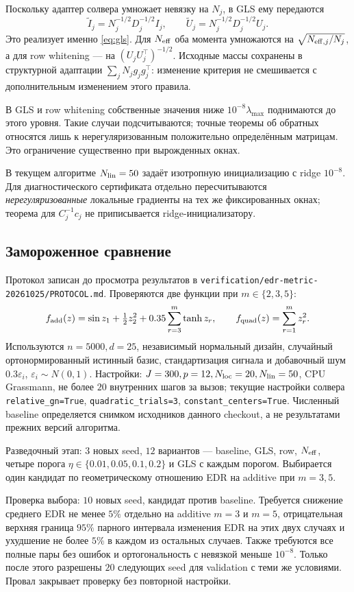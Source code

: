 \documentclass[11pt,a4paper]{article}
\newcommand{\code}[1]{\nolinkurl{#1}}
\begin{document}
Поскольку адаптер солвера умножает невязку на $N_j$, в GLS ему передаются
\[
 \widetilde I_j=N_j^{-1/2}D_j^{-1/2}I_j,\qquad
 \widetilde U_j=N_j^{-1/2}D_j^{-1/2}U_j.
\]
Это реализует именно \eqref{eq:gls}. Для $N_{\rm eff}$ оба момента
умножаются на $\sqrt{N_{{\rm eff},j}/N_j}$, а для row whitening ---
на $(U_jU_j^\top)^{-1/2}$. Исходные массы сохранены в структурной
адаптации $\sum_jN_jg_jg_j^\top$: изменение критерия не смешивается
с дополнительным изменением этого правила.

В GLS и row whitening собственные значения ниже
$10^{-8}\lambda_{\max}$ поднимаются до этого уровня. Такие случаи
подсчитываются; точные теоремы об обратных относятся лишь к
нерегуляризованным положительно определённым матрицам.
Это ограничение существенно при вырожденных окнах.

В текущем алгоритме $N_{\rm lin}=50$ задаёт изотропную инициализацию
с ridge $10^{-8}$. Для диагностического сертификата отдельно
пересчитываются \emph{нерегуляризованные} локальные градиенты
на тех же фиксированных окнах; теорема для $C_j^{-1}c_j$ не
приписывается ridge-инициализатору.

\subsection{Замороженное сравнение}
Протокол записан до просмотра результатов в
\code{verification/edr-metric-20261025/PROTOCOL.md}.
Проверяются две функции при $m\in\{2,3,5\}$:
\[
 f_{\rm add}(z)=\sin z_1+\tfrac12z_2^2+
 0.35\sum_{r=3}^m\tanh z_r,\qquad
 f_{\rm quad}(z)=\sum_{r=1}^m z_r^2.
\]
Используются $n=5000,d=25$, независимый нормальный дизайн,
случайный ортонормированный истинный базис, стандартизация сигнала
и добавочный шум $0.3\varepsilon_i$, $\varepsilon_i\sim N(0,1)$.
Настройки: $J=300,p=12,N_{\rm loc}=20,N_{\rm lin}=50$,
CPU Grassmann, не более $20$ внутренних шагов за вызов;
текущие настройки солвера \code{relative_gn=True},
\code{quadratic_trials=3}, \code{constant_centers=True}.
Численный baseline определяется снимком исходников данного checkout,
а не результатами прежних версий алгоритма.

Разведочный этап: $3$ новых seed, $12$ вариантов --- baseline, GLS,
row, $N_{\rm eff}$, четыре порога $\eta\in\{0.01,0.05,0.1,0.2\}$
и GLS с каждым порогом. Выбирается один кандидат по геометрическому
отношению EDR на additive при $m=3,5$.

Проверка выбора: $10$ новых seed, кандидат против baseline.
Требуется снижение среднего EDR не менее $5\%$ отдельно на additive
$m=3$ и $m=5$, отрицательная верхняя граница $95\%$ парного интервала
изменения EDR на этих двух случаях и ухудшение не более $5\%$
в каждом из остальных случаев. Также требуются все полные пары
без ошибок и ортогональность с невязкой меньше $10^{-8}$.
Только после этого разрешены $20$ следующих seed для validation
с теми же условиями. Провал закрывает проверку без повторной настройки.
\end{document}
